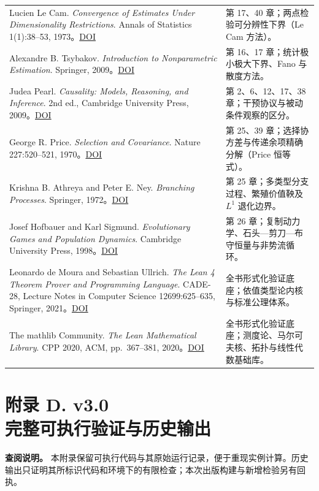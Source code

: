 \documentclass[
  11pt,
  oneside]{book}
\begin{document}
{\begin{longtable}[]{@{}
  >{\raggedright\arraybackslash}p{}
  >{\raggedright\arraybackslash}p{}@{}}
Lucien Le Cam. \emph{Convergence of Estimates Under Dimensionality Restrictions}. Annals of Statistics 1(1):38--53, 1973。\href{https://doi.org/10.1214/aos/1176342362}{DOI} & 第 17、40 章；两点检验可分辨性下界（Le Cam 方法）。 \\
Alexandre B. Tsybakov. \emph{Introduction to Nonparametric Estimation}. Springer, 2009。\href{https://doi.org/10.1007/b13794}{DOI} & 第 16、17 章；统计极小极大下界、Fano 与散度方法。 \\
Judea Pearl. \emph{Causality: Models, Reasoning, and Inference}. 2nd ed., Cambridge University Press, 2009。\href{https://doi.org/10.1017/CBO9780511803161}{DOI} & 第 2、6、12、17、38 章；干预协议与被动条件观察的区分。 \\
George R. Price. \emph{Selection and Covariance}. Nature 227:520--521, 1970。\href{https://doi.org/10.1038/227520a0}{DOI} & 第 25、39 章；选择协方差与传递余项精确分解（Price 恒等式）。 \\
Krishna B. Athreya and Peter E. Ney. \emph{Branching Processes}. Springer, 1972。\href{https://doi.org/10.1007/978-3-642-65371-1}{DOI} & 第 25 章；多类型分支过程、繁殖价值鞅及 \(L^1\) 退化边界。 \\
Josef Hofbauer and Karl Sigmund. \emph{Evolutionary Games and Population Dynamics}. Cambridge University Press, 1998。\href{https://doi.org/10.1017/CBO9781139173179}{DOI} & 第 26 章；复制动力学、石头---剪刀---布守恒量与非势流循环。 \\
Leonardo de Moura and Sebastian Ullrich. \emph{The Lean 4 Theorem Prover and Programming Language}. CADE-28, Lecture Notes in Computer Science 12699:625--635, Springer, 2021。\href{https://doi.org/10.1007/978-3-030-79876-5_37}{DOI} & 全书形式化验证底座；依值类型论内核与标准公理体系。 \\
The mathlib Community. \emph{The Lean Mathematical Library}. CPP 2020, ACM, pp.~367--381, 2020。\href{https://doi.org/10.1145/3372885.3373824}{DOI} & 全书形式化验证底座；测度论、马尔可夫核、拓扑与线性代数基础库。 \\
\end{longtable}
}

\chapter[附录 D. v3.0 完整可执行验证与历史输出]{附录 D. v3.0\\完整可执行验证与历史输出}\label{appendix-d}

\textbf{查阅说明。} 本附录保留可执行代码与其原始运行记录，便于重现实例计算。历史输出只证明其所标识代码和环境下的有限检查；本次出版构建与新增检验另有回执。
\end{document}
